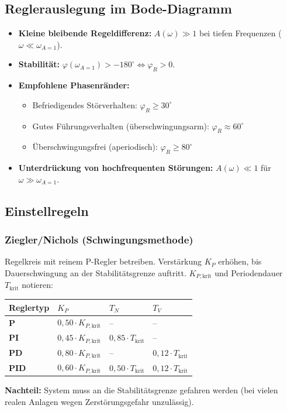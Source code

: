 \subsection{Reglerauslegung im Bode-Diagramm}
\begin{tcolorbox}
\begin{itemize}
  \item \textbf{Kleine bleibende Regeldifferenz:} $A(\omega) \gg 1$ bei tiefen Frequenzen ($\omega \ll \omega_{A=1}$).
  \item \textbf{Stabilität:} $\varphi(\omega_{A=1}) > -180^\circ \iff \varphi_R > 0$.
  \item \textbf{Empfohlene Phasenränder:}
  \begin{itemize}
    \item Befriedigendes Störverhalten: $\varphi_R \ge 30^\circ$
    \item Gutes Führungsverhalten (überschwingungsarm): $\varphi_R \approx 60^\circ$
    \item Überschwingungsfrei (aperiodisch): $\varphi_R \ge 80^\circ$
  \end{itemize}
  \item \textbf{Unterdrückung von hochfrequenten Störungen:} $A(\omega) \ll 1$ für $\omega \gg \omega_{A=1}$.
\end{itemize}
\end{tcolorbox}

\subsection{Einstellregeln}

\subsubsection{Ziegler/Nichols (Schwingungsmethode)}
\begin{tcolorbox}
Regelkreis mit reinem P-Regler betreiben. Verstärkung $K_P$ erhöhen, bis Dauerschwingung an der Stabilitätsgrenze auftritt. $K_{P,\text{krit}}$ und Periodendauer $T_{\text{krit}}$ notieren:
\begin{center}
\small
\begin{tabular}{l l l l}
\toprule
\textbf{Reglertyp} & $K_P$ & $T_N$ & $T_V$ \\
\midrule
\textbf{P} & $0{,}50 \cdot K_{P,\text{krit}}$ & -- & -- \\
\textbf{PI} & $0{,}45 \cdot K_{P,\text{krit}}$ & $0{,}85 \cdot T_{\text{krit}}$ & -- \\
\textbf{PD} & $0{,}80 \cdot K_{P,\text{krit}}$ & -- & $0{,}12 \cdot T_{\text{krit}}$ \\
\textbf{PID} & $0{,}60 \cdot K_{P,\text{krit}}$ & $0{,}50 \cdot T_{\text{krit}}$ & $0{,}12 \cdot T_{\text{krit}}$ \\
\bottomrule
\end{tabular}
\end{center}
\textbf{Nachteil:} System muss an die Stabilitätsgrenze gefahren werden (bei vielen realen Anlagen wegen Zerstörungsgefahr unzulässig).
\end{tcolorbox}

